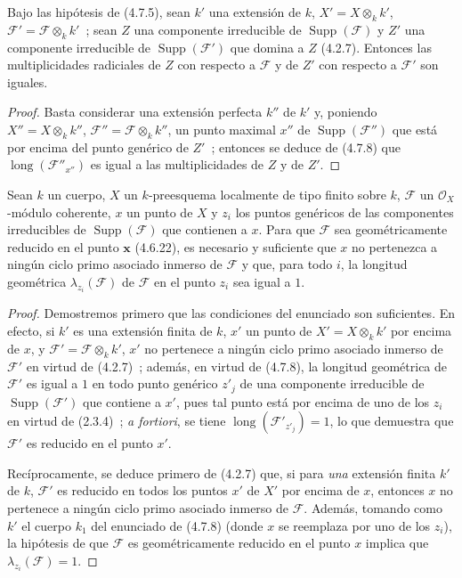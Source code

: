 \begin{corollary}[4.7.9]
\label{IV.2.4.7.9-fr}
Bajo las hipótesis de \textup{(4.7.5)}, sean $k'$ una extensión de $k$,
$X'=X\otimes_k k'$, $\mathscr F'=\mathscr F\otimes_k k'$~; sean $Z$ una
componente irreducible de $\operatorname{Supp}(\mathscr F)$ y $Z'$ una
componente irreducible de $\operatorname{Supp}(\mathscr F')$ que domina a $Z$
\textup{(4.2.7)}. Entonces las multiplicidades radiciales de $Z$ con respecto a
$\mathscr F$ y de $Z'$ con respecto a $\mathscr F'$ son iguales.
\end{corollary}


\begin{proof}
Basta considerar una extensión perfecta $k''$ de $k'$ y, poniendo
$X''=X\otimes_k k''$, $\mathscr F''=\mathscr F\otimes_k k''$, un punto maximal
$x''$ de $\operatorname{Supp}(\mathscr F'')$ que está por encima del punto
genérico de $Z'$~; entonces se deduce de (4.7.8) que
$\operatorname{long}(\mathscr F''_{x''})$ es igual a las multiplicidades de $Z$
y de $Z'$.
\end{proof}

\begin{proposition}[4.7.10]
\label{IV.2.4.7.10-fr}
Sean $k$ un cuerpo, $X$ un $k$-preesquema localmente de tipo finito sobre $k$,
$\mathscr F$ un $\mathcal O_X$-módulo coherente, $x$ un punto de $X$ y $z_i$ los
puntos genéricos de las componentes irreducibles de
$\operatorname{Supp}(\mathscr F)$ que contienen a $x$. Para que $\mathscr F$ sea
geométricamente reducido en el punto $\boldsymbol{x}$ \textup{(4.6.22)}, es necesario y suficiente
que $x$ no pertenezca a ningún ciclo primo asociado inmerso de $\mathscr F$ y
que, para todo $i$, la longitud geométrica $\lambda_{z_i}(\mathscr F)$ de
$\mathscr F$ en el punto $z_i$ sea igual a $1$.
\end{proposition}

\begin{proof}
Demostremos primero que las condiciones del enunciado son suficientes. En
efecto, si $k'$ es una extensión finita de $k$, $x'$ un punto de
$X'=X\otimes_k k'$ por encima de $x$, y
$\mathscr F'=\mathscr F\otimes_k k'$, $x'$ no pertenece a ningún ciclo primo
asociado inmerso de $\mathscr F'$ en virtud de (4.2.7)~; además, en virtud de
(4.7.8), la longitud geométrica de $\mathscr F'$ es igual a $1$ en todo punto
genérico $z'_j$ de una componente irreducible de
$\operatorname{Supp}(\mathscr F')$ que contiene a $x'$, pues tal punto está por
encima de uno de los $z_i$ en virtud de (2.3.4)~; \emph{a fortiori}, se tiene
$\operatorname{long}(\mathscr F'_{z'_j})=1$, lo que demuestra que $\mathscr F'$
es reducido en el punto $x'$.

Recíprocamente, se deduce primero de (4.2.7) que, si para \emph{una} extensión finita
$k'$ de $k$, $\mathscr F'$ es reducido en todos los puntos $x'$ de $X'$ por
encima de $x$, entonces $x$ no pertenece a ningún ciclo primo asociado inmerso
de $\mathscr F$. Además, tomando como $k'$ el cuerpo $k_1$ del enunciado de
(4.7.8) (donde $x$ se reemplaza por uno de los $z_i$), la hipótesis de que
$\mathscr F$ es geométricamente reducido en el punto $x$ implica que
$\lambda_{z_i}(\mathscr F)=1$.
\end{proof}

